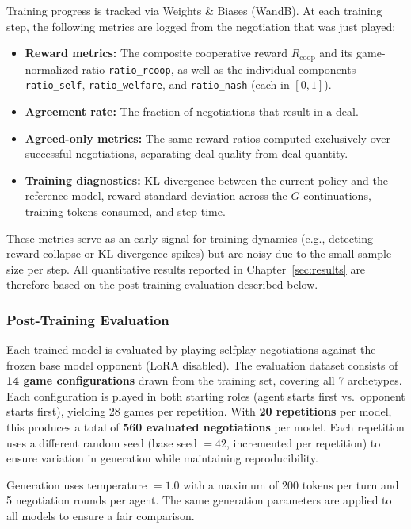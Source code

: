 \documentclass[12pt,a4paper]{article}
\begin{document}
Training progress is tracked via Weights \& Biases (WandB). At each training step, the following metrics are logged from the negotiation that was just played:

\begin{itemize}
    \item \textbf{Reward metrics:} The composite cooperative reward $R_{\text{coop}}$ and its game-normalized ratio \texttt{ratio\_rcoop}, as well as the individual components \texttt{ratio\_self}, \texttt{ratio\_welfare}, and \texttt{ratio\_nash} (each in $[0, 1]$).
    \item \textbf{Agreement rate:} The fraction of negotiations that result in a deal.
    \item \textbf{Agreed-only metrics:} The same reward ratios computed exclusively over successful negotiations, separating deal quality from deal quantity.
    \item \textbf{Training diagnostics:} KL divergence between the current policy and the reference model, reward standard deviation across the $G$ continuations, training tokens consumed, and step time.
\end{itemize}

These metrics serve as an early signal for training dynamics (e.g., detecting reward collapse or KL divergence spikes) but are noisy due to the small sample size per step. All quantitative results reported in Chapter~\ref{sec:results} are therefore based on the post-training evaluation described below.

\subsubsection{Post-Training Evaluation}

Each trained model is evaluated by playing selfplay negotiations against the frozen base model opponent (LoRA disabled). The evaluation dataset consists of \textbf{14 game configurations} drawn from the training set, covering all 7 archetypes. Each configuration is played in both starting roles (agent starts first vs.\ opponent starts first), yielding 28 games per repetition. With \textbf{20 repetitions} per model, this produces a total of \textbf{560 evaluated negotiations} per model. Each repetition uses a different random seed (base seed $= 42$, incremented per repetition) to ensure variation in generation while maintaining reproducibility.

Generation uses temperature $= 1.0$ with a maximum of 200 tokens per turn and 5 negotiation rounds per agent. The same generation parameters are applied to all models to ensure a fair comparison.
\end{document}
